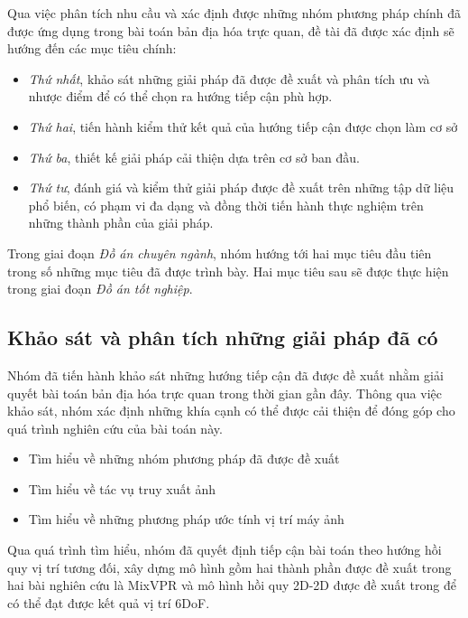 Qua việc phân tích nhu cầu và xác định được những nhóm phương pháp chính đã được ứng dụng trong bài toán bản địa hóa trực quan, đề tài đã được xác định sẽ hướng đến các mục tiêu chính:

\begin{itemize}
    \item \textit{Thứ nhất}, khảo sát những giải pháp đã được đề xuất và phân tích ưu và nhược điểm để có thể chọn ra hướng tiếp cận phù hợp.
    \item \textit{Thứ hai}, tiến hành kiểm thử kết quả của hướng tiếp cận được chọn làm cơ sở
    \item \textit{Thứ ba}, thiết kế giải pháp cải thiện dựa trên cơ sở ban đầu.
    \item \textit{Thứ tư}, đánh giá và kiểm thử giải pháp được đề xuất trên những tập dữ liệu phổ biến, có phạm vi đa dạng và đồng thời tiến hành thực nghiệm trên những thành phần của giải pháp.
\end{itemize}

Trong giai đoạn \textit{Đồ án chuyên ngành}, nhóm hướng tới hai mục tiêu đầu tiên trong số những mục tiêu đã được trình bày. Hai mục tiêu sau sẽ được thực hiện trong giai đoạn \textit{Đồ án tốt nghiệp}.

\subsection{Khảo sát và phân tích những giải pháp đã có}
Nhóm đã tiến hành khảo sát những hướng tiếp cận đã được đề xuất nhằm giải quyết bài toán bản địa hóa trực quan trong thời gian gần đây. Thông qua việc khảo sát, nhóm xác định những khía cạnh có thể được cải thiện để đóng góp cho quá trình nghiên cứu của bài toán này.
\begin{itemize}
    \item Tìm hiểu về những nhóm phương pháp đã được đề xuất
    \item Tìm hiểu về tác vụ truy xuất ảnh
    \item Tìm hiểu về những phương pháp ước tính vị trí máy ảnh
\end{itemize}

Qua quá trình tìm hiểu, nhóm đã quyết định tiếp cận bài toán theo hướng hồi quy vị trí tương đối, xây dựng mô hình gồm hai thành phần được đề xuất trong hai bài nghiên cứu là MixVPR \cite{alibey2023mixvpr} và mô hình hồi quy 2D-2D được đề xuất trong \cite{arnold2022mapfree} để có thể đạt được kết quả vị trí 6DoF.


